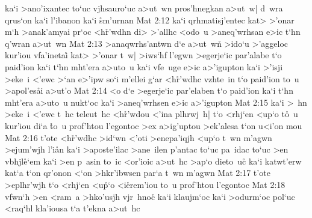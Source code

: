 ka`i
>ano'ixantec
to`uc
vjhsauro`uc
a>ut~wn
pros'hnegkan
a>ut~w|
d~wra
qrus`on
ka`i
l'ibanon
ka`i
\r{s}m'urnan\bibvsend
{}
\vs Mat 2:12
ka`i
qrhmatisj'entec
kat>
>'onar
m`h
>anak'amyai
pr`oc
<h\r{r}'wdhn
di>
>'allhc
<odo~u
>aneq'wrhsan
e>ic
t`hn
q'wran
a>ut~wn\bibvsend
\vs Mat 2:13
>anaqwrhs'antwn
d`e
a>ut~w\r{n}
>ido`u
>'aggeloc
kur'iou
vfa'inetai\r{}
kat>
>'onar
t~w|
>iws`hf
l'egwn
>egerje`ic
par'alabe
t`o
paid'ion
ka`i
t`hn
mht'era
a>uto~u
ka`i
vfe~uge
e>ic
a>'igupton
ka`i
>'isji
>eke~i
<'ewc
>`an
e>'ipw
so`i
m'ellei
g`ar
<h\r{r}'wdhc
vzhte~in
t`o
paid'ion
to~u
>apol'es\r{a}i
a>ut'o\bibvsend
\vs Mat 2:14
<o
d`e
>egerje`ic
par'elaben
t`o
paid'ion
ka`i
t`hn
mht'era
a>uto~u
nukt`oc
ka`i
>aneq'wrhsen
e>ic
a>'igupton\bibvsend
\vs Mat 2:15
ka`i
>~hn
>eke~i
<'ewc
t~hc
teleut~hc
<h\r{r}'wdou
<'ina
plhrwj~h|
t`o
<rhj`en
<up`o
t\r{o}~u
kur'iou
di`a
\r{t}o~u
prof'htou
l'egontoc
>ex
a>ig'uptou
>ek'alesa
t`on
u<i'on
mou\bibvsend
\vs Mat 2:16
t'ote
<h\r{r}'wdhc
>id`wn
<'oti
>enepa'iqjh
<up`o
t~wn
m'agwn
>ejum'wjh
l'i\r{a}n
ka`i
>aposte'ilac
>ane~ilen
p'antac
to`uc
pa~idac
to`uc
>en
vbhjl\r{e}`em
ka`i
>en
p~asin
to~ic
<or'ioic
a>ut~hc
>ap`o
dieto~uc\r{}
ka`i
katwt'erw
kat`a
t`on
qr'onon
<`on
>hkr'ibwsen
par`a
t~wn
m'agwn\bibvsend
\vs Mat 2:17
t'ote
>eplhr'wjh
t`o
<rhj`en
<u\r{p}`o
<i\r{e}rem'iou
to~u
prof'htou
l'egontoc\bibvsend
\vs Mat 2:18
vfwn`h
>en
<ram~a
>hko'usjh
vjr~hnoc\r{}
ka`i
klaujm`oc
ka`i
>odurm`oc
pol`uc
<raq`hl
kla'iousa
t`a
t'ekna
a>ut~hc
